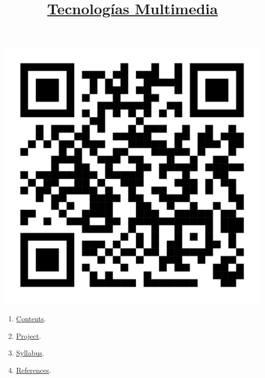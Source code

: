 
%
\title{\href{https://www.ual.es/estudios/grados/presentacion/plandeestudios/asignatura/4015/40154321}{Tecnologías Multimedia}}

\maketitle

\begin{center}
  \includegraphics{TM_codigo_QR.png}
\end{center}

\begin{enumerate}
\item \href{https://tecnologias-multimedia.github.io/contents}{Contents}.
\item \href{https://github.com/Tecnologias-Multimedia/InterCom}{Project}.
\item \href{https://tecnologias-multimedia.github.io/syllabus}{Syllabus}.
\item \href{https://tecnologias-multimedia.github.io/references}{References}.
\end{enumerate}
